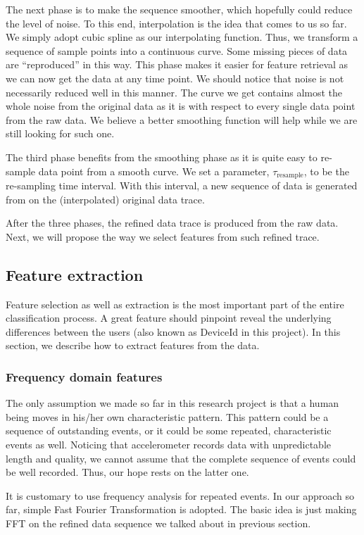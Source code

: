 \documentclass{article} %
\begin{document}
The next phase is to make the sequence smoother, which hopefully could reduce the level of noise. To this end, interpolation is the idea that comes to us so far. We simply adopt cubic spline as our interpolating function. Thus, we transform a sequence of sample points into a continuous curve. Some missing pieces of data are ``reproduced'' in this way. This phase makes it easier for feature retrieval as we can now get the data at any time point. We should notice that noise is not necessarily reduced well in this manner. The curve we get contains almost the whole noise from the original data as it is with respect to every single data point from the raw data. We believe a better smoothing function will help while we are still looking for such one.

The third phase benefits from the smoothing phase as it is quite easy to re-sample data point from a smooth curve. We set a parameter, $\tau_\mathrm{resample}$, to be the re-sampling time interval. With this interval, a new sequence of data is generated from on the (interpolated) original data trace.

After the three phases, the refined data trace is produced from the raw data. Next, we will propose the way we select features from such refined trace.

\subsection{Feature extraction}
Feature selection as well as extraction is the most important part of the entire classification process. A great feature should pinpoint reveal the underlying differences between the users (also known as DeviceId in this project). In this section, we describe how to extract features from the data.
	
\subsubsection{Frequency domain features}
The only assumption we made so far in this research project is that a human being moves in his/her own characteristic pattern. This pattern could be a sequence of outstanding events, or it could be some repeated, characteristic events as well. Noticing that accelerometer records data with unpredictable length and quality, we cannot assume that the complete sequence of events could be well recorded. Thus, our hope rests on the latter one. 

It is customary to use frequency analysis for repeated events. In our approach so far, simple Fast Fourier Transformation is adopted. The basic idea is just making FFT on the refined data sequence we talked about in previous section.
\end{document}
